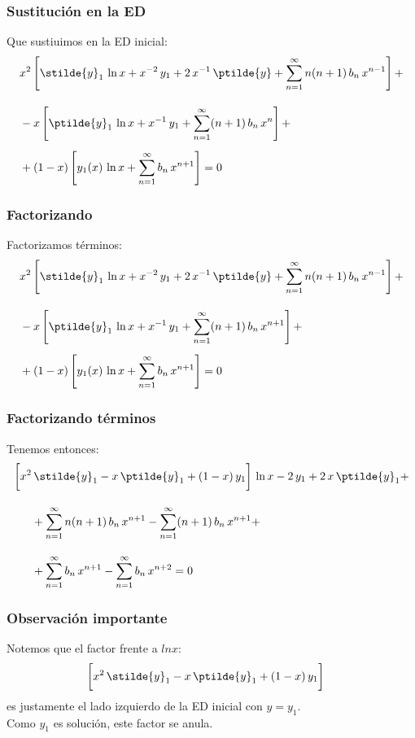 \begin{frame}
\frametitle{Sustitución en la ED}
Que sustiuimos en la ED inicial:
\begin{align*}
&x^{2} \left[ \stilde{y}_{1} \, \ln x + x^{-2} \, y_{1} + 2 \, x^{-1} \, \ptilde{y} + \sum_{n=1}^{\infty} n (n + 1) \, b_{n} \, x^{n-1} \right] + \\[1em]
&- x \left[ \ptilde{y}_{1} \, \ln x + x^{-1} \, y_{1} + \sum_{n=1}^{\infty} (n + 1) \, b_{n} \, x^{n} \right] + \\[0.5em]
&+ (1 - x) \left[ y_{1}(x) \, \ln x + \sum_{n=1}^{\infty} b_{n} \, x^{n+1} \right] = 0
\end{align*}
\end{frame}
\begin{frame}
\frametitle{Factorizando}
Factorizamos términos:
\fontsize{12}{12}\selectfont
\begin{align*}
&x^{2} \left[ \stilde{y}_{1} \, \ln x + x^{-2} \, y_{1} + 2 \, x^{-1} \, \ptilde{y} + \sum_{n=1}^{\infty} n (n + 1) \, b_{n} \, x^{n-1} \right] + \\[1em]
&- x \left[ \ptilde{y}_{1} \, \ln x + x^{-1} \, y_{1} + \sum_{n=1}^{\infty} (n + 1) \, b_{n} \, x^{n+1} \right] + \\[0.5em]
&+ (1 - x) \left[ y_{1}(x) \, \ln x + \sum_{n=1}^{\infty} b_{n} \, x^{n+1} \right] = 0
\end{align*}
\end{frame}
\begin{frame}
\frametitle{Factorizando términos}
Tenemos entonces:
\begin{align*}
\bigg[ x^{2} &\, \stilde{y}_{1} - x \, \ptilde{y}_{1} + (1 - x) \, y_{1} \bigg] \, \ln x - 2 \, y_{1} +  2 \, x \, \ptilde{y}_{1} + \\[1em]
& + \sum_{n=1}^{\infty} n (n + 1) \, b_{n} \, x^{n+1} - \sum_{n=1}^{\infty} (n + 1) \, b_{n} \, x^{n+1} + \\[1em]
&+ \sum_{n=1}^{\infty} b_{n} \, x^{n+1} - \sum_{n=1}^{\infty} b_{n} \, x^{n+2} = 0
\end{align*} 
\end{frame}
\begin{frame}
\frametitle{Observación importante}
Notemos que el factor frente a $ln x$:
\begin{align*}
\bigg[ x^{2} &\, \stilde{y}_{1} - x \, \ptilde{y}_{1} + (1 - x) \, y_{1} \bigg]
\end{align*}
es justamente el lado izquierdo de la ED inicial con $y = y_{1}$.
\\
\bigskip
Como $y_{1}$ es solución, este factor se anula.
\end{frame}
